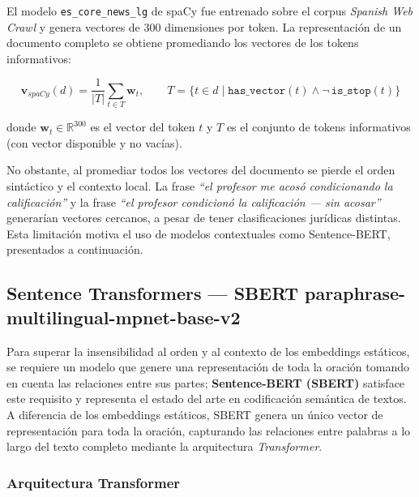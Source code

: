 El modelo \texttt{es\_core\_news\_lg} de spaCy \cite{honnibal2020} fue entrenado sobre el corpus
\textit{Spanish Web Crawl} y genera vectores de 300 dimensiones por token. La
representación de un documento completo se obtiene promediando los vectores de
los tokens informativos:

\begin{equation}
  \mathbf{v}_{spaCy}(d)
  = \frac{1}{|T|} \sum_{t \in T} \mathbf{w}_t, \qquad
  T = \bigl\{t \in d \;\big|\; \texttt{has\_vector}(t)
      \wedge \neg\,\texttt{is\_stop}(t)\bigr\}
  \label{eq:spacy}
\end{equation}

donde $\mathbf{w}_t \in \mathbb{R}^{300}$ es el vector del token $t$ y $T$ es
el conjunto de tokens informativos (con vector disponible y no vacías).

No obstante, al promediar todos los vectores del documento se pierde el orden
sintáctico y el contexto local. La frase \textit{``el profesor me acosó
condicionando la calificación''} y la frase \textit{``el profesor condicionó la
calificación — sin acosar''} generarían vectores cercanos, a pesar de tener
clasificaciones jurídicas distintas. Esta limitación motiva el uso de modelos
contextuales como Sentence-BERT, presentados a continuación.

\subsection{Sentence Transformers — SBERT paraphrase-multilingual-mpnet-base-v2}

Para superar la insensibilidad al orden y al contexto de los embeddings estáticos,
se requiere un modelo que genere una representación de toda la oración tomando en
cuenta las relaciones entre sus partes; \textbf{Sentence-BERT (SBERT)} satisface
este requisito y representa el estado del arte en codificación semántica de
textos.\cite{reimers2019} A diferencia de los embeddings estáticos, SBERT genera
un único vector de representación para toda la oración, capturando las relaciones
entre palabras a lo largo del texto completo mediante la arquitectura
\textit{Transformer}.

\subsubsection*{Arquitectura Transformer}


